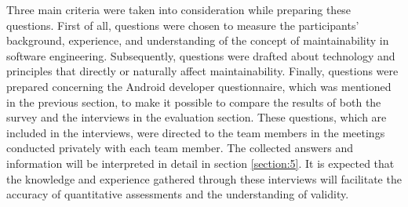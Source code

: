 Three main criteria were taken into consideration while preparing these questions. First of all, questions were chosen to measure the participants' background, experience, and understanding of the concept of maintainability in software engineering. Subsequently, questions were drafted about technology and principles that directly or naturally affect maintainability. Finally, questions were prepared concerning the Android developer questionnaire, which was mentioned in the previous section, to make it possible to compare the results of both the survey and the interviews in the evaluation section. These questions, which are included in the interviews, were directed to the team members in the meetings conducted privately with each team member. The collected answers and information will be interpreted in detail in section \ref{section:5}. It is expected that the knowledge and experience gathered through these interviews will facilitate the accuracy of quantitative assessments and the understanding of validity.